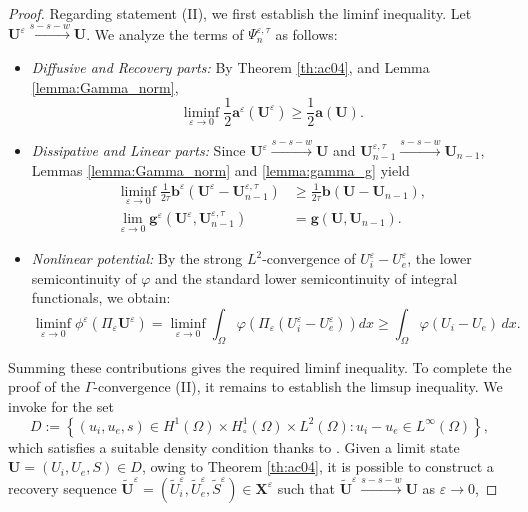 \documentclass[a4paper,11pt]{article}
\theoremstyle{definition}
\numberwithin{equation}{section}
\newcommand{\e}{\varepsilon}
\begin{document}
\begin{proof}
	Regarding statement (II), we first establish the liminf inequality. Let $\mathbf{U}^\e \xrightarrow{s-s-w} \mathbf{U}$. We analyze the terms of $\Psi_n^{\e, \tau}$ as follows:
	\begin{itemize}
		\item \textit{Diffusive and Recovery parts:} By Theorem \ref{th:ac04}, and Lemma \ref{lemma:Gamma_norm}, %
		\begin{equation*}
			\liminf_{\e \to 0} \frac{1}{2} \mathbf{a}^\e(\mathbf{U}^\e) \ge \frac{1}{2} \mathbf{a}(\mathbf{U}).
		\end{equation*}
		\item \textit{Dissipative and Linear parts:} Since $\mathbf{U}^\e \xrightarrow{s-s-w} \mathbf{U}$ and $\mathbf{U}_{n-1}^{\e,\tau} \xrightarrow{s-s-w} \mathbf{U}_{n-1}$, Lemmas \ref{lemma:Gamma_norm} and \ref{lemma:gamma_g} yield
		\begin{align*}
			\liminf_{\e \to 0} \frac{1}{2\tau} \mathbf{b}^\e(\mathbf{U}^\e - \mathbf{U}_{n-1}^{\e,\tau}) &\ge \frac{1}{2\tau} \mathbf{b}(\mathbf{U} - \mathbf{U}_{n-1}), \\
			\lim_{\e \to 0} \mathbf{g}^\e(\mathbf{U}^\e, \mathbf{U}_{n-1}^{\e,\tau}) &= \mathbf{g}(\mathbf{U}, \mathbf{U}_{n-1}).
		\end{align*}
		\item \textit{Nonlinear potential:} %
		By the strong $L^2$-convergence of $U_{i}^{\e}-U_{e}^{\e}$, the lower semicontinuity of $\varphi$ and the standard lower semicontinuity of integral functionals, we obtain: 
		\begin{equation*}
			\liminf_{\e \to 0} \phi^\e(\Pi_\e\mathbf{U}^\e) = \liminf_{\e \to 0} \int_\Omega \varphi(\Pi_\e(U_{i}^{\e}-U_{e}^{\e}))d x \ge \int_\Omega \varphi(U_{i} - U_{e}) \, dx.
		\end{equation*}
	\end{itemize}
	Summing these contributions gives the required liminf inequality. To complete the proof of the $\Gamma$-convergence (II), it remains to establish the limsup inequality. We invoke \cite[Proposition 6.5]{PSCF05} for the set 
	\[
	D:= \left\{ (u_i,u_e,s)\in H^1(\Omega)\times H^1_\circ(\Omega)\times L^2(\Omega) : u_i-u_e \in L^\infty(\Omega)\right\},
	\]
	which satisfies a suitable density condition thanks to \cite[Lemma 4.19]{PSCF05}.
	Given a limit state $\mathbf{U}=(U_i, U_e, S) \in D$, owing to Theorem \ref{th:ac04}, it is possible to construct a recovery sequence $\widetilde{\mathbf{U}}^{\e} = (\widetilde{U}_{i}^{\e}, \widetilde{U}_{e}^{\e}, \widetilde{S}^{\e}) \in \mathbf{X}^\e$ such that $\widetilde{\mathbf{U}}^{\e} \xrightarrow{s-s-w} \mathbf{U}$ as $\e \to 0$,

\end{proof}
\end{document}
